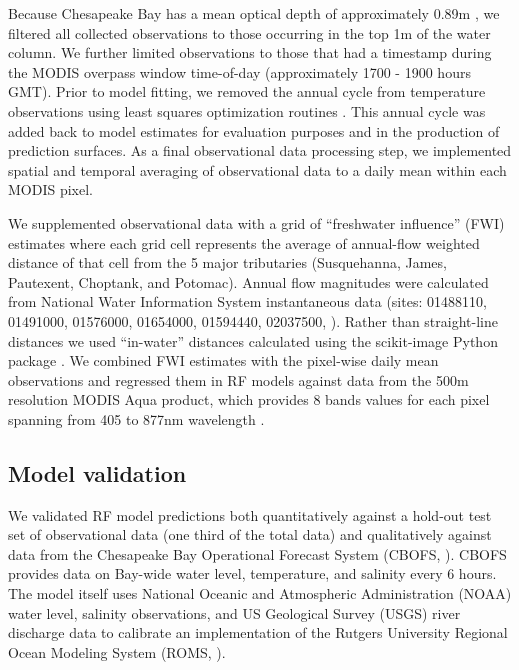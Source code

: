 \documentclass{article}
\begin{document}
Because Chesapeake Bay has a mean optical depth of approximately 0.89m \citep{urquhartRemotelySensedEstimates2012}, we filtered all collected observations to those occurring in the top 1m of the water column. We further limited observations to those that had a timestamp during the MODIS overpass window time-of-day (approximately 1700 - 1900 hours GMT). Prior to model fitting, we removed the annual cycle from temperature observations using least squares optimization routines \citep{virtanenSciPyFundamentalAlgorithms2020a}. This annual cycle was added back to model estimates for evaluation purposes and in the production of prediction surfaces. As a final observational data processing step, we implemented spatial and temporal averaging of observational data to a daily mean within each MODIS pixel.

We supplemented observational data with a grid of “freshwater influence” (FWI) estimates where each grid cell represents the average of annual-flow weighted distance of that cell from the 5 major tributaries (Susquehanna, James, Pautexent, Choptank, and Potomac). Annual flow magnitudes were calculated from National Water Information System instantaneous data (sites: 01488110, 01491000, 01576000, 01654000, 01594440, 02037500, \citet{nwis2021usgs}). Rather than straight-line distances we used “in-water” distances calculated using the scikit-image Python package \citep{littleKrigingEstuariesCrow1997,vanderwaltScikitimageImageProcessing2014}. We combined FWI estimates with the pixel-wise daily mean observations and regressed them in RF models against data from the 500m resolution MODIS Aqua product, which provides 8 bands values for each pixel spanning from 405 to 877nm wavelength \citep{vermoteericMOD09GAMODISTerra2015}.


\subsection{Model validation}

We validated RF model predictions both quantitatively against a hold-out test set of observational data (one third of the total data) and qualitatively against data from the Chesapeake Bay Operational Forecast System (CBOFS, \citet{lanerolle2011second}). CBOFS provides data on Bay-wide water level, temperature, and salinity every 6 hours. The model itself uses National Oceanic and Atmospheric Administration (NOAA) water level, salinity observations, and US Geological Survey (USGS) river discharge data to calibrate an implementation of the Rutgers University Regional Ocean Modeling System (ROMS, \citet{shchepetkinRegionalOceanicModeling2005}).
\end{document}
